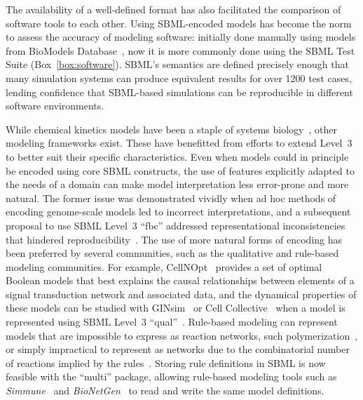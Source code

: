 \documentclass{sbml-paper}
\begin{document}
The availability of a well-defined format has also facilitated the comparison of software tools to each other.  Using SBML-encoded models has become the norm to assess the accuracy of modeling software: initially done manually using models from BioModels Database~\citep{bergmann2008comparing}, now it is more commonly done using the SBML Test Suite (Box~\ref{box:software}).  SBML's semantics are defined precisely enough that many simulation systems can produce equivalent results for over 1200 test cases, lending confidence that SBML-based simulations can be reproducible in different software environments.

While chemical kinetics models have been a staple of systems biology~\citep{hubner2011applications}, other modeling frameworks exist.  These have benefitted from efforts to extend Level~3 to better suit their specific characteristics.  Even when models could in principle be encoded using core SBML constructs, the use of features explicitly adapted to the needs of a domain can make model interpretation less error-prone and more natural.  The former issue was demonstrated vividly when ad hoc methods of encoding genome-scale models led to incorrect interpretations, and a subsequent proposal to use SBML Level~3 ``fbc'' addressed representational inconsistencies that hindered reproducibility~\citep{Ebrahim2015}.  The use of more natural forms of encoding has been preferred by several communities, such as the qualitative and rule-based modeling communities.  For example, CellNOpt~\citep{terfve2012cellnoptr} provides a set of optimal Boolean models that best explains the causal relationships between elements of a signal transduction network and associated data, and the dynamical properties of these models can be studied with GINsim~\citep{chaouiya2012logical} or Cell Collective~\citep{helikar2012cell} when a model is represented using SBML Level~3 ``qual''~\citep{Chaouiya2015sbml}.  Rule-based modeling can represent models that are impossible to express as reaction networks, such polymerization~\citep{faeder2009rule}, or simply impractical to represent as networks due to the combinatorial number of reactions implied by the rules~\citep{Hlavacek2003complexity}.  Storing rule definitions in SBML is now feasible with the ``multi'' package, allowing rule-based modeling tools such as \emph{Simmune}~\citep{zhang2013simmune} and \emph{BioNetGen}~\citep{faeder2009rule, Harris2016bionetgen} to read and write the same model definitions.  %
\end{document}
